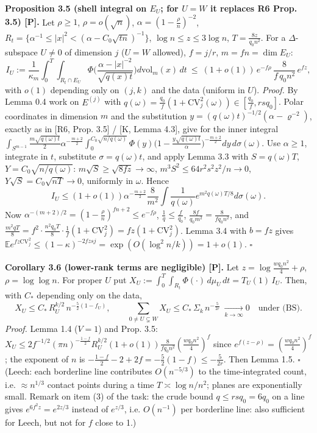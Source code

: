 \textbf{Proposition 3.5 (shell integral on \(E_U\); for \(U=W\) it replaces R6 Prop. 3.5) {[}P{]}.} Let \(\rho\ge1\), \(\rho=o(\sqrt n)\), \(\alpha=(1-\frac\rho n)^{-2}\), \(R_t=\{\alpha^{-1}\le|x|^2<(\alpha-C_0\sqrt{tn})^{-1}\}\), \(\log n\le z\le3\log n\), \(T=\frac{8z}{q_0n^2}\). For a \(\Delta\)-subspace \(U\ne0\) of dimension \(j\) (\(U=W\) allowed), \(f=j/r\), \(m=fn=\dim E_U\):
\[I_U:=\frac1{\kappa_m}\int_0^T\!\!\int_{R_t\cap E_U}\Phi\Big(\frac{\alpha-|x|^{-2}}{\sqrt{q(x)t}}\Big)d\mathrm{vol}_m(x)\,dt\ \le\ (1+o(1))\,e^{-f\rho}\,\frac{8}{f\,q_0n^2}\,e^{fz},\]
with \(o(1)\) depending only on \((j,k)\) and the data (uniform in \(U\)).
\emph{Proof.} By Lemma 0.4 work on \(E^{(j)}\) with \(q(\omega)=\frac{q_0}f(1+\mathrm{CV}_j^2(\omega))\in[\frac{q_0}f,rsq_0]\). Polar coordinates in dimension \(m\) and the substitution \(y=(q(\omega)t)^{-1/2}(\alpha-\varrho^{-2})\), exactly as in {[}R6, Prop. 3.5{]} / {[}K, Lemma 4.3{]}, give for the inner integral
\(\int_{S^{m-1}}\frac{m\sqrt{q(\omega)t}}2\alpha^{-\frac{m+2}2}\int_0^{C_0\sqrt{n/q(\omega)}}\Phi(y)\big(1-\frac{y\sqrt{q(\omega)t}}\alpha\big)^{-\frac{m+2}2}dy\,d\sigma(\omega)\). Use \(\alpha\ge1\), integrate in \(t\), substitute \(\sigma=q(\omega)t\), and apply Lemma 3.3 with \(S=q(\omega)T\), \(Y=C_0\sqrt{n/q(\omega)}\): \(m\sqrt S\ge\sqrt{8fz}\to\infty\), \(m^3S^2\le64r^2s^2z^2/n\to0\), \(Y\sqrt S=C_0\sqrt{nT}\to0\), uniformly in \(\omega\). Hence
\[I_U\le(1+o(1))\alpha^{-\frac{m+2}2}\frac8{m^2}\int\frac1{q(\omega)}e^{m^2q(\omega)T/8}d\sigma(\omega).\]
Now \(\alpha^{-(m+2)/2}=(1-\frac\rho n)^{fn+2}\le e^{-f\rho}\), \(\frac1q\le\frac f{q_0}\), \(\frac{8f}{q_0m^2}=\frac8{fq_0n^2}\), and \(\frac{m^2qT}8=f^2\cdot\frac{n^2q_0T}8\cdot\frac1f(1+\mathrm{CV}_j^2)=fz(1+\mathrm{CV}_j^2)\). Lemma 3.4 with \(b=fz\) gives \(\mathbb Ee^{fz\mathrm{CV}_j^2}\le(1-\kappa)^{-2fzsj}=\exp(O(\log^2n/k))=1+o(1)\). \(\square\)

\textbf{Corollary 3.6 (lower-rank terms are negligible) {[}P{]}.} Let \(z=\log\frac{wq_0n^2}4+\rho\), \(\rho=\log\log n\). For proper \(U\) put \(X_U:=\int_0^T\int_{R_t}\Phi(\cdot)\,d\mu_U\,dt=T_U(1)\,I_U\). Then, with \(C_*\) depending only on the data,
\[X_U\le C_*\,R_U^{k/2}\,n^{-\frac52(1-f_U)},\qquad \sum_{0\ne U\subsetneq W}X_U\le C_*\,\Sigma_k\,n^{-\frac5{2r}}\ \xrightarrow[k\to\infty]{}0\quad\text{under (BS)} .\]
\emph{Proof.} Lemma 1.4 (\(V=1\)) and Prop. 3.5: \(X_U\le2f^{-1/2}(\pi n)^{-\frac{1-f}2}R_U^{k/2}(1+o(1))\frac8{fq_0n^2}(\frac{wq_0n^2}4)^f\) since \(e^{f(z-\rho)}=(\frac{wq_0n^2}4)^f\); the exponent of \(n\) is \(-\frac{1-f}2-2+2f=-\frac52(1-f)\le-\frac5{2r}\). Then Lemma 1.5. \(\square\)
(Leech: each borderline line contributes \(O(n^{-5/3})\) to the time-integrated count, i.e. \(\approx n^{1/3}\) contact points during a time \(T\asymp\log n/n^2\); planes are exponentially small. Remark on item (3) of the task: the crude bound \(q\le rsq_0=6q_0\) on a line gives \(e^{6f^2z}=e^{2z/3}\) instead of \(e^{z/3}\), i.e. \(O(n^{-1})\) per borderline line: also sufficient for Leech, but not for \(f\) close to 1.)

